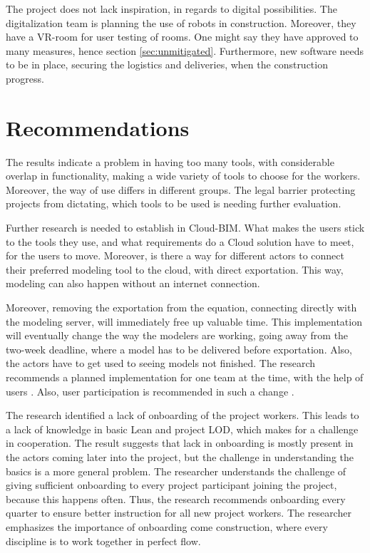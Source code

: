 The project does not lack inspiration, in regards to digital possibilities. The digitalization team is planning the use of robots in construction. Moreover, they have a VR-room for user testing of rooms. One might say they have approved to many measures, hence section \ref{sec:unmitigated}. Furthermore, new software needs to be in place, securing the logistics and deliveries, when the construction progress. 

\section{Recommendations}
The results indicate a problem in having too many tools, with considerable overlap in functionality, making a wide variety of tools to choose for the workers. Moreover, the way of use differs in different groups. The legal barrier protecting projects from dictating, which tools to be used is needing further evaluation. 

Further research is needed to establish in Cloud-BIM. What makes the users stick to the tools they use, and what requirements do a Cloud solution have to meet, for the users to move. Moreover, is there a way for different actors to connect their preferred modeling tool to the cloud, with direct exportation. This way, modeling can also happen without an internet connection.  

Moreover, removing the exportation from the equation, connecting directly with the modeling server, will immediately free up valuable time. This implementation will eventually change the way the modelers are working, going away from the two-week deadline, where a model has to be delivered before exportation. Also, the actors have to get used to seeing models not finished. The research recommends a planned implementation for one team at the time, with the help of users \cite{bratteteig2016unpacking}. Also, user participation is recommended in such a change \cite{hatling1998social, ehn1993scandinavian}.

The research identified a lack of onboarding of the project workers. This leads to a lack of knowledge in basic Lean and project LOD, which makes for a challenge in cooperation. The result suggests that lack in onboarding is mostly present in the actors coming later into the project, but the challenge in understanding the basics is a more general problem. The researcher understands the challenge of giving sufficient onboarding to every project participant joining the project, because this happens often. Thus, the research recommends onboarding every quarter to ensure better instruction for all new project workers. The researcher emphasizes the importance of onboarding come construction, where every discipline is to work together in perfect flow.

